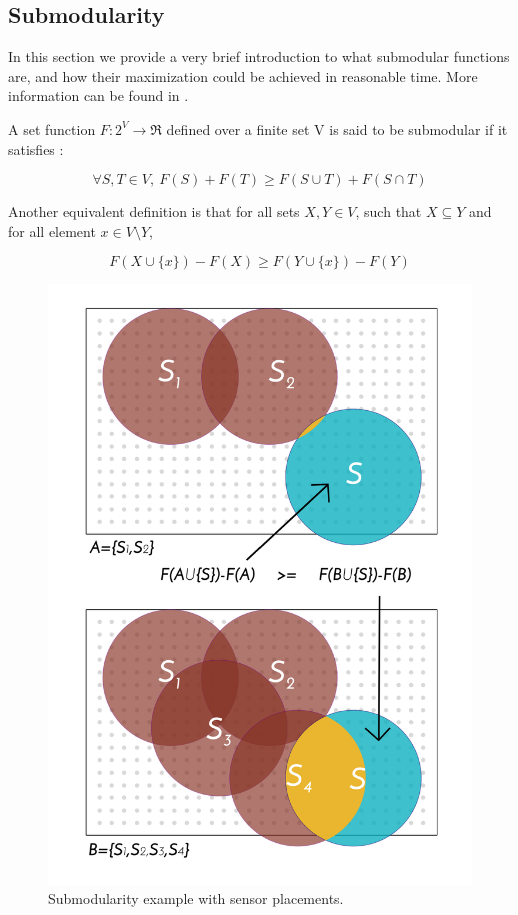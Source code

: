 \documentclass[conference]{IEEEtran}
\begin{document}
\subsection{Submodularity}

In this section we provide a very brief introduction to what submodular functions are, and how their maximization could be achieved in reasonable time. More information can be found in \cite{Krause2014}.

 A set function $ F:2^{V} \longrightarrow \Re $ defined over a finite set V is said to be submodular if it satisfies :

\begin{equation}
\forall S,T \in V,\ F(S) + F(T) \geq F(S \cup T) + F(S \cap T)
\end{equation}

Another equivalent definition is that for all sets $ X, Y \in V$, such that $ X \subseteq Y$ and for all element $ x \in V \setminus Y$,

\begin{equation}
F(X \cup \{ x \} ) - F(X) \geq F(Y \cup \{ x \} ) - F(Y)
\end{equation} 

\begin{figure}
	\label{fig:submodular}
	\begin{center}
	\includegraphics[scale=.3]{./figure_1/figure_1}
	\caption{Submodularity example with sensor placements.}
	\end{center}
\end{figure}
\end{document}
